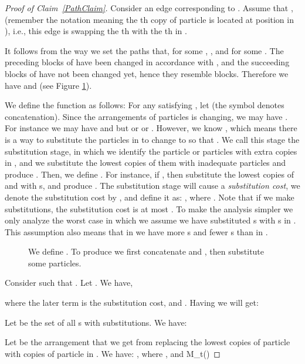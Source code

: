 \documentclass[10 pt]{article}
\begin{document}
\begin{proof}[Proof of Claim~\ref{PathClaim}]


Consider an edge  corresponding to . Assume that , 
(remember the notation  meaning the th copy of particle  is located at position  in ),
i.e., this edge is swapping the th  with the th  in .


It follows from the  way we set the paths that, for some , ,
and  for some . 
The preceding blocks of  have been changed in accordance with , and the succeeding blocks of  have
not been changed yet, hence they resemble  blocks.
Therefore we have  and  (see Figure \ref{Move2fig}).

We define the function  as follows: 
For any  satisfying , let 
(the symbol  denotes concatenation). Since the arrangements of particles is changing, we may have
. For instance we may have  and
 but  or  or .
However, we know , which means there is a way to substitute the particles
in  to change  to  so that .
We call this stage the substitution stage, in which we identify the particle or particles with extra copies in ,
and we substitute the lowest copies of them with inadequate particles and produce .
Then, we define .
For instance, if  , then substitute the lowest  copies of  and
 with s, and produce .
The substitution stage will cause a \emph{substitution cost}, we denote the substitution cost by ,
and define it as: , where  . Note that
if we make  substitutions, the substitution cost is at most .
To make the analysis simpler we only analyze the worst case in which we assume we have substituted 
s with s in . This assumption also means that in  we have  more s and  fewer s than in .  

\begin{figure}[!ht]

\centerline{}

\caption{We define . To produce  we first concatenate  and , then
substitute some particles.}\label{Move2fig}
\end{figure}



Consider  such that . Let . We have, 

where the later term is the substitution cost, and .
Having  we will get:





Let   be the set of all s with  substitutions. We  have:


Let   be the  arrangement that we get from replacing the lowest  copies of particle  with copies of particle 
in  . We have:
, where , and 
M_t(\alpha)


\end{proof}
\end{document}
